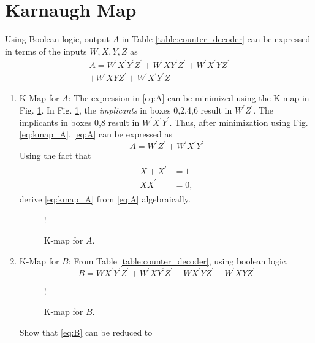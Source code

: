 \documentclass[journal,12pt,twocolumn]{IEEEtran}
\begin{document}
\section{Karnaugh Map}

%
Using Boolean logic, output $A$  in Table \ref{table:counter_decoder} can be expressed in terms of the inputs $W,X,Y,Z$ as
\begin{multline}
\label{eq:A}
A = W^{\prime}X^{\prime}Y^{\prime}Z^{\prime} + W^{\prime}XY^{\prime}Z^{\prime}
+W^{\prime}X^{\prime}YZ^{\prime}
\\
+W^{\prime}XYZ^{\prime}
+W^{\prime}X^{\prime}Y^{\prime}Z
\end{multline}
\begin{enumerate}[1.]
\item K-Map for $A$: 
The expression in \eqref{eq:A}  can be minimized using the K-map in Fig. \ref{fig:kmap_A}.
In Fig. \ref{fig:kmap_A},  the {\em implicants} in boxes 0,2,4,6 result in $W^{\prime}Z^{\prime}$.  The implicants in
boxes 0,8 result in $W^{\prime}X^{\prime}Y^{\prime}$.  Thus, after minimization using Fig. \ref{eq:kmap_A},  \eqref{eq:A} can be expressed as
%
\begin{equation}
\label{eq:kmap_A}
A = W^{\prime}Z^{\prime}+W^{\prime}X^{\prime}Y^{\prime}
\end{equation}
%
Using the fact that
\begin{align}
\label{eq:boolean}
\begin{split}
X+X^{\prime} &= 1
\\
XX^{\prime} &= 0,
\end{split}
\end{align}
%
derive \eqref{eq:kmap_A} from \eqref{eq:A} algebraically.
%
%
%
\begin{figure}[!h]
\resizebox {\columnwidth} {!} {

}
\caption{K-map for $A$.}
\label{fig:kmap_A}
\end{figure}
%
\item K-Map for $B$:
From Table \ref{table:counter_decoder}, using boolean logic,
\begin{equation}
\label{eq:B}
B = WX^{\prime}Y^{\prime}Z^{\prime} + W^{\prime}XY^{\prime}Z^{\prime}
+WX^{\prime}YZ^{\prime}
+W^{\prime}XYZ^{\prime}
\end{equation}
%
\begin{figure}[!h]
\resizebox {\columnwidth} {!} {

}
\caption{K-map for $B$.}
\label{fig:kmap_B}
\end{figure}
%
Show that \eqref{eq:B} can be reduced to
\begin{equation}

\end{equation}
\end{enumerate}
\end{document}
